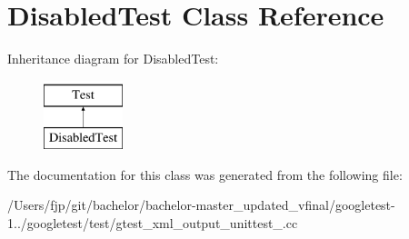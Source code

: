 \hypertarget{class_disabled_test}{}\section{Disabled\+Test Class Reference}
\label{class_disabled_test}
Inheritance diagram for Disabled\+Test\+:\begin{figure}[H]
\begin{center}
\leavevmode
\includegraphics[height=2.000000cm]{class_disabled_test}
\end{center}
\end{figure}


The documentation for this class was generated from the following file\+:\begin{DoxyCompactItemize}
\item 
/\+Users/fjp/git/bachelor/bachelor-\/master\+\_\+updated\+\_\+vfinal/googletest-\/1../googletest/test/gtest\+\_\+xml\+\_\+output\+\_\+unittest\+\_\+.\+cc\end{DoxyCompactItemize}
